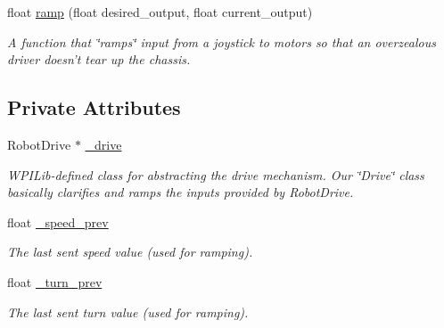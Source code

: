 \begin{DoxyCompactItemize}
float \hyperlink{class_r_j_f_r_c2011_1_1_drive_ad816025f2d8dbbed3049f611a6e63a90}{ramp} (float desired\_\-output, float current\_\-output)
\begin{DoxyCompactList}\small\item\em A function that \char`\"{}ramps\char`\"{} input from a joystick to motors so that an overzealous driver doesn't tear up the chassis. \item\end{DoxyCompactList}\end{DoxyCompactItemize}
\subsection*{Private Attributes}
\begin{DoxyCompactItemize}
\item 
\hypertarget{class_r_j_f_r_c2011_1_1_drive_a869d7df0f00c2f9b5c62abe8ade90298}{
RobotDrive $\ast$ \hyperlink{class_r_j_f_r_c2011_1_1_drive_a869d7df0f00c2f9b5c62abe8ade90298}{\_\-drive}}
\label{class_r_j_f_r_c2011_1_1_drive_a869d7df0f00c2f9b5c62abe8ade90298}

\begin{DoxyCompactList}\small\item\em WPILib-\/defined class for abstracting the drive mechanism. Our \char`\"{}Drive\char`\"{} class basically clarifies and ramps the inputs provided by RobotDrive. \item\end{DoxyCompactList}\item 
\hypertarget{class_r_j_f_r_c2011_1_1_drive_a242653143f6cd0b7e35a3249ab14a9d1}{
float \hyperlink{class_r_j_f_r_c2011_1_1_drive_a242653143f6cd0b7e35a3249ab14a9d1}{\_\-speed\_\-prev}}
\label{class_r_j_f_r_c2011_1_1_drive_a242653143f6cd0b7e35a3249ab14a9d1}

\begin{DoxyCompactList}\small\item\em The last sent speed value (used for ramping). \item\end{DoxyCompactList}\item 
\hypertarget{class_r_j_f_r_c2011_1_1_drive_a0cd549eb20982cfeea32e197d3c613e9}{
float \hyperlink{class_r_j_f_r_c2011_1_1_drive_a0cd549eb20982cfeea32e197d3c613e9}{\_\-turn\_\-prev}}
\label{class_r_j_f_r_c2011_1_1_drive_a0cd549eb20982cfeea32e197d3c613e9}

\begin{DoxyCompactList}\small\item\em The last sent turn value (used for ramping). \item\end{DoxyCompactList}\end{DoxyCompactItemize}


